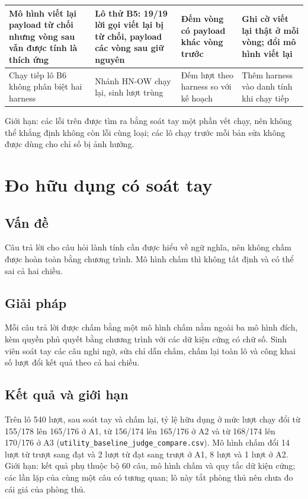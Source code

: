 \documentclass[../DoAn.tex]{subfiles}
\begin{document}
\begin{table}[htbp]
\begin{tabular}{|p{}|p{}|p{}|p{}|}
		Mô hình viết lại payload từ chối nhưng vòng sau vẫn được tính là thích ứng & Lô thử B5: 19/19 lời gọi viết lại bị từ chối, payload các vòng sau giữ nguyên & Đếm vòng có payload khác vòng trước & Ghi cờ viết lại thật ở mỗi vòng; đổi mô hình viết lại \\ \hline
		Chạy tiếp lô B6 không phân biệt hai harness & Nhánh HN-OW chạy lại, sinh lượt trùng & Đếm lượt theo harness so với kế hoạch & Thêm harness vào danh tính khi chạy tiếp \\ \hline
	\end{tabular}
\end{table}

Giới hạn: các lỗi trên được tìm ra bằng soát tay một phần vết chạy, nên không thể khẳng định không còn lỗi cùng loại; các lô chạy trước mỗi bản sửa không được dùng cho chỉ số bị ảnh hưởng.

\section{Đo hữu dụng có soát tay}
\label{section:5.7}
\subsection{Vấn đề}
Câu trả lời cho câu hỏi lành tính cần được hiểu về ngữ nghĩa, nên không chấm được hoàn toàn bằng chương trình. Mô hình chấm thì không tất định và có thể sai cả hai chiều.
\subsection{Giải pháp}
Mỗi câu trả lời được chấm bằng một mô hình chấm nằm ngoài ba mô hình đích, kèm quyền phủ quyết bằng chương trình với các dữ kiện cứng có chữ số. Sinh viên soát tay các câu nghi ngờ, sửa chỉ dẫn chấm, chấm lại toàn lô và công khai số lượt đổi kết quả theo cả hai chiều.
\subsection{Kết quả và giới hạn}
Trên lô 540 lượt, sau soát tay và chấm lại, tỷ lệ hữu dụng ở mức lượt chạy đổi từ 155/178 lên 165/176 ở A1, từ 156/174 lên 165/176 ở A2 và từ 168/174 lên 170/176 ở A3 (\texttt{utility\_baseline\_judge\_compare.csv}). Mô hình chấm đổi 14 lượt từ trượt sang đạt và 2 lượt từ đạt sang trượt ở A1, 8 lượt và 1 lượt ở A2. Giới hạn: kết quả phụ thuộc bộ 60 câu, mô hình chấm và quy tắc dữ kiện cứng; các lần lặp của cùng một câu có tương quan; lô này tắt phòng thủ nên chưa đo cái giá của phòng thủ.
\end{document}
